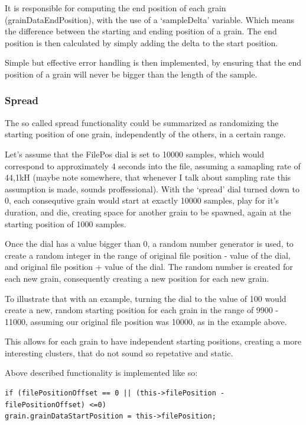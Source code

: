 It is responsible for computing the end position of each grain
(grainDataEndPosition), with the use of a `sampleDelta'
variable. Which means the difference between the starting and ending
position of a grain. The end position is then calculated by simply
adding the delta to the start position.

Simple but effective error handling is then implemented, by ensuring
that the end position of a grain will never be bigger than the length
of the sample.

\subsubsection{Spread}
The so called spread functionality could be summarized as randomizing
the starting position of one grain, independently of the others, in a
certain range.

Let's assume that the FilePos dial is set to 10000 samples, which
would correspond to approximately 4 seconds into the file, assuming a
samapling rate of 44,1kH (maybe note somewhere, that whenever I talk
about sampling rate this assumption is made, sounds
proffessional). With the `spread' dial turned down to 0, each
consequtive grain would start at exactly 10000 samples, play for it's
duration, and die, creating space for another grain to be spawned,
again at the starting position of 1000 samples.

Once the dial has a value bigger than 0, a random number generator is
used, to create a random integer in the range of original file
position - value of the dial, and original file position + value of
the dial. The random number is created for each new grain,
consequently creating a new position for each new grain.

To illustrate that with an example, turning the dial to the value of
100 would create a new, random starting position for each grain in the
range of 9900 - 11000, assuming our original file position was 10000,
as in the example above.

This allows for each grain to have independent starting positions,
creating a more interesting clusters, that do not sound so repetative
and static.

Above described functionality is implemented like so:

\begin{lstlisting}
if (filePositionOffset == 0 || (this->filePosition -
filePositionOffset) <=0)
grain.grainDataStartPosition = this->filePosition;
\end{lstlisting}

